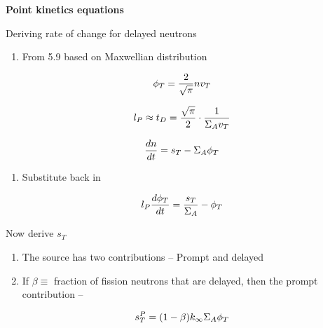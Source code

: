 \documentclass[aspectratio=1610,pdftex,dvipsnames,compress,xcolor={dvipsnames}]{beamer}
\begin{document}
\begin{frame}[plain]{}
    \centering\LARGE\textbf{Point kinetics equations}
\end{frame}


\addtocounter{framenumber}{-1} 
\begin{frame}{Deriving rate of change for delayed neutrons}
    \begin{enumerate}[series=outerlist,topsep=0pt,itemsep=21pt,leftmargin=*,label=(\arabic*)]
        \item[]From 5.9 based on Maxwellian distribution
    \end{enumerate}

    \vspace*{\fill}

    \begin{equation}
        \LARGE
        \phi_T = \frac{2}{\sqrt{\pi}} nv_T
    \end{equation}

    \begin{equation}
        \LARGE
        l_P \approx t_D = \frac{\sqrt{\pi}}{2} \cdot \frac{1}{\Sigma_A v_T}
    \end{equation}

    \begin{equation}
        \LARGE
        \frac{dn}{dt} = s_T - \Sigma_A \phi_T
    \end{equation}

    \vspace*{\fill}

    \begin{enumerate}[series=outerlist,topsep=0pt,itemsep=21pt,leftmargin=*,label=(\arabic*)]
        \item[]Substitute back in
    \end{enumerate}

    \vspace*{\fill}

    \begin{equation}
        \LARGE
        l_P\frac{d\phi_T}{dt}=\frac{s_T}{\Sigma_A}-\phi_T
    \end{equation}
\end{frame}


\begin{frame}{Now derive $s_T$}
    \begin{enumerate}[series=outerlist,topsep=0pt,itemsep=21pt,leftmargin=*,label=(\arabic*)]
        \item[]The source has two contributions -- Prompt and delayed
        \item[]If $\beta \equiv$ fraction of fission neutrons that are delayed, then the prompt contribution --
    \end{enumerate}

    \vspace*{\fill}

    \begin{equation}
        \LARGE
        s_T^P = (1 - \beta) k_\infty \Sigma_A \phi_T
    \end{equation}
\end{frame}
\end{document}
